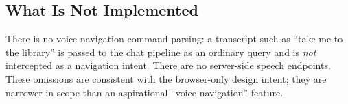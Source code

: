 \subsection{What Is Not Implemented}
There is no voice-navigation command parsing: a transcript such as ``take
me to the library'' is passed to the chat pipeline as an ordinary query and
is \emph{not} intercepted as a navigation intent. There are no server-side
speech endpoints. These omissions are consistent with the browser-only
design intent; they are narrower in scope than an aspirational ``voice
navigation'' feature.
